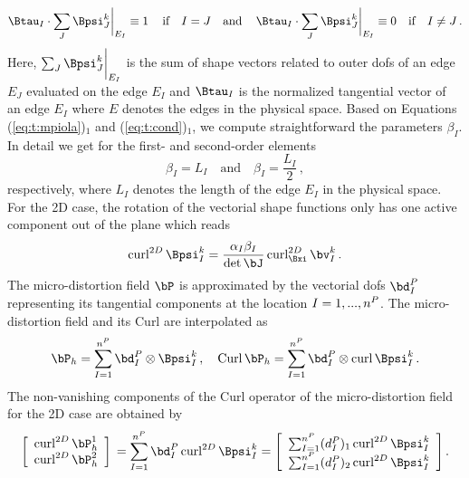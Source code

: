 \begin{equation}
\label{eq:t:cond}
\Btau_I \cdot \sum_J {{\Bpsi}}_J^k  \bigg\rvert_{E_I}  \equiv 1  \quad \, \textrm{if}  \quad  I=J  \quad \textrm{and} \, \quad
\Btau_I \cdot \sum_J {{\Bpsi}}_J^k  \bigg\rvert_{E_I}  \equiv 0 \quad \textrm{if} \quad  I \ne J  \,.
\end{equation}
Here, $\sum_J {{\Bpsi}}_J^k  \bigg\rvert_{E_I} $ is the sum of shape vectors related to outer dofs of an edge $E_J$ evaluated on the edge $E_I$ and $\Btau_I$ is the normalized tangential vector of an edge $E_I$ where $E$ denotes the edges in the physical space.  
Based on Equations (\ref{eq:t:mpiola})$_1$ and (\ref{eq:t:cond})$_1$, we compute straightforward the parameters $\beta_I$. In detail we get for the first- and second-order elements 
\begin{equation}
\beta_I = L_I   \quad \textrm{and} \quad   \beta_I = \frac{L_I}{2}\,,
\end{equation}
respectively, where $L_I$ denotes the length of the edge $E_I$ in the physical space. For the 2D case, the rotation of the vectorial shape functions only has one active component out of the plane which reads 
\begin{equation}
 \curl^{2D}{\Bpsi^k_I} = \frac{ \alpha_I  \beta_I }{\det{\bJ}} \curl^{2D}_{\Bxi}\bv^k_I\,.
\end{equation}
The micro-distortion field $\Bdis$ is  approximated by the vectorial dofs $\bd^\dis_I$ representing its tangential components at the location $I=1,...,n^P$. The micro-distortion field and its Curl are interpolated as 
\begin{equation}
\label{eq:t:dis_restoring}
\Bdis_h =   \sum_{I=1}^{n^\dis}   \bd^\dis_I \otimes \Bpsi^k_I \, , \quad 
\Curl \Bdis_h  =  \sum_{I=1}^{n^\dis}   \bd^\dis_I  \otimes \curl{{\Bpsi}^k_I} \,.
\end{equation}
The non-vanishing components of the Curl operator of the micro-distortion field for the 2D case are obtained by 
\begin{equation}
\left[\begin{array}{c}
\curl^{2D}{\Bdis_h^{1}} \\
  \curl^{2D}{\Bdis_h^{2}} \\
\end{array}\right]\,
 =  \sum_{I=1}^{n^\dis}   \bd^\dis_I  \curl^{2D}{{\Bpsi}^k_I} =  \left[\begin{array}{c}
\sum_{I=1}^{n^\dis}   (d^\dis_I)_1  \curl^{2D}{{\Bpsi}^k_I} \\
 \sum_{I=1}^{n^\dis}   (d^\dis_I)_2  \curl^{2D}{{\Bpsi}^k_I}  \\
\end{array}\right]. 
\end{equation}


